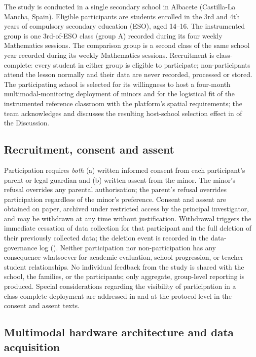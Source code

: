 The study is conducted in a single secondary school in Albacete (Castilla-La Mancha, Spain). Eligible participants are students enrolled in the 3rd and 4th years of compulsory secondary education (ESO), aged 14--16. The instrumented group is one 3rd-of-ESO class (group A) recorded during its four weekly Mathematics sessions. The comparison group is a second class of the same school year recorded during its weekly Mathematics sessions. Recruitment is class-complete: every student in either group is eligible to participate; non-participants attend the lesson normally and their data are never recorded, processed or stored. The participating school is selected for its willingness to host a four-month multimodal-monitoring deployment of minors and for the logistical fit of the instrumented reference classroom with the platform's spatial requirements; the team acknowledges and discusses the resulting host-school selection effect in  of the Discussion.

\subsection{Recruitment, consent and assent}\label{subsec:recruitment}

Participation requires \emph{both} (a) written informed consent from each participant's parent or legal guardian and (b) written assent from the minor. The minor's refusal overrides any parental authorisation; the parent's refusal overrides participation regardless of the minor's preference. Consent and assent are obtained on paper, archived under restricted access by the principal investigator, and may be withdrawn at any time without justification. Withdrawal triggers the immediate cessation of data collection for that participant and the full deletion of their previously collected data; the deletion event is recorded in the data-governance log (). Neither participation nor non-participation has any consequence whatsoever for academic evaluation, school progression, or teacher--student relationships. No individual feedback from the study is shared with the school, the families, or the participants; only aggregate, group-level reporting is produced. Special considerations regarding the visibility of participation in a class-complete deployment are addressed in  and at the protocol level in the consent and assent texts.

\subsection{Multimodal hardware architecture and data acquisition}\label{subsec:sensor-stack}

